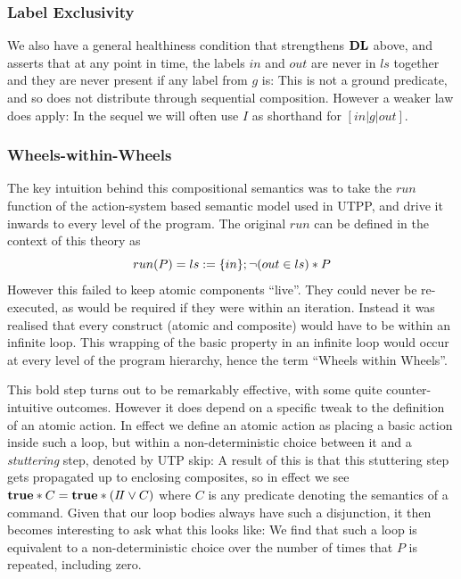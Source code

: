 \subsubsection{Label Exclusivity}\label{sssec:label-exclude}

We also have a general healthiness condition that strengthens $\mathbf{DL}$ above,
and asserts that at any point in time, the labels $in$ and $out$ are never in
$ls$ together and they are never present if any label from $g$ is:
This is not a ground predicate, and so does not distribute through
sequential composition. However a weaker law does apply:
In the sequel we will often use $I$
as shorthand for $[in|g|out]$.



\subsubsection{Wheels-within-Wheels}\label{sssec:WwW}

The key intuition behind this compositional semantics was to take the
$run$ function of the action-system based semantic model used in UTPP,
and drive it inwards to every level of the program.
The original $run$ can be defined in the context of this theory as
\[
  run(P) = ls := \{in\} ; \lnot (out \in ls) * P
\]
However this failed to keep atomic components ``live''.
They could never be re-executed,
as would be required if they were within an iteration.
Instead it was realised that every construct (atomic and composite)
would have to be within an infinite loop.%
%
This wrapping of the basic property in an infinite loop
would occur at every level of the program hierarchy,
hence the term ``Wheels within Wheels''.

This bold step turns out to be remarkably effective,
with some quite counter-intuitive outcomes.
However it does depend on a specific tweak to the
definition of an atomic action.
In effect we define an atomic action
as placing a basic action inside such a loop,
but within a non-deterministic choice between it
and a \emph{stuttering} step, denoted by UTP skip:
A result of this is that this stuttering step gets
propagated up to enclosing composites,
so in effect we see $\mathbf{true} * C = \mathbf{true} * (I\!I\lor C)$
where $C$ is any predicate denoting the semantics of a command.
Given that our loop bodies always have such a disjunction,
it then becomes interesting to ask what this looks like:
We find that such a loop is equivalent to a non-deterministic
choice over the number of times that $P$ is repeated,
including zero.

